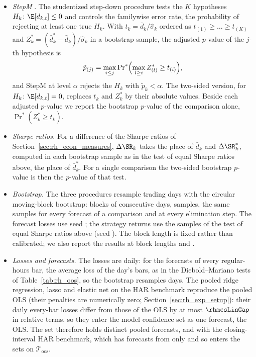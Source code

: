 \begin{itemize}
    with $\hat\sigma_k$ the bootstrap standard deviation of $\bar d_k$. We report its consistent $p$-value.
  \item \emph{StepM} \citep{RomanoWolf2005}. The studentized step-down procedure tests the $K$ hypotheses
    $H_k\colon \E[d_{k,t}] \le 0$ and controls the familywise error rate, the probability of rejecting at least one
    true $H_k$. With $t_k = \bar d_k/\hat\sigma_k$ ordered as $t_{(1)} \ge \dots \ge t_{(K)}$ and
    $Z^{*}_k = (\bar d^{*}_k - \bar d_k)/\hat\sigma_k$ in a bootstrap sample, the adjusted $p$-value of the $j$-th
    hypothesis is
    \[
      \tilde p_{(j)} = \max_{i \le j} \Pr\nolimits^{*}\Bigl(\max_{l \ge i} Z^{*}_{(l)} \ge t_{(i)}\Bigr),
    \]
    and StepM at level $\alpha$ rejects the $H_k$ with $\tilde p_k < \alpha$. The two-sided version, for
    $H_k\colon \E[d_{k,t}] = 0$, replaces $t_k$ and $Z^{*}_k$ by their absolute values. Beside each adjusted $p$-value
    we report the bootstrap $p$-value of the comparison alone, $\Pr^{*}(Z^{*}_k \ge t_k)$.
  \item \emph{Sharpe ratios.} For a difference of the Sharpe ratios of Section~\ref{sec:rh_econ_measures},
    $\Delta\SR_k$ takes the place of $\bar d_k$ and $\Delta\SR^{*}_k$, computed in each bootstrap sample as in the
    test of equal Sharpe ratios above, the place of $\bar d^{*}_k$. For a single comparison the two-sided bootstrap
    $p$-value is then the $p$-value of that test.
  \item \emph{Bootstrap.} The three procedures resample trading days with the circular moving-block bootstrap: blocks
    of \rhmcsBlock{} consecutive days, \rhmcsB{} samples, the same samples for every forecast of a comparison and at
    every elimination step. The forecast losses use seed \rhmcsSeed; the strategy returns use the samples of the test
    of equal Sharpe ratios above (seed \rhmcsSeedEcon). The block length is fixed rather than calibrated; we also
    report the results at block lengths \rhmcsBlockLo{} and \rhmcsBlockHi.
  \item \emph{Losses and forecasts.} The losses are daily: for the forecasts of every regular-hours bar, the average
    loss of the day's \rhorNBars{} bars, as in the Diebold--Mariano tests of Table~\ref{tab:rh_oos}, so the bootstrap
    resamples days. The pooled ridge regression, lasso and elastic net on the HAR benchmark reproduce the pooled OLS
    (their penalties are numerically zero; Section~\ref{sec:rh_exp_setup}): their daily every-bar losses differ from
    those of the OLS by at most $\rhmcsLinGap$ in relative terms, so they enter the model confidence set as one
    forecast, the OLS. The set therefore holds \rhmcsNModelsWord{} distinct pooled forecasts, and
    \rhmcsNModelsBenchWord{} with the closing-interval HAR benchmark, which has forecasts from \rhmcsChStart{} only
    and so enters the sets on $\mathcal T_{\mathrm{oos}}$.
  \end{itemize}

